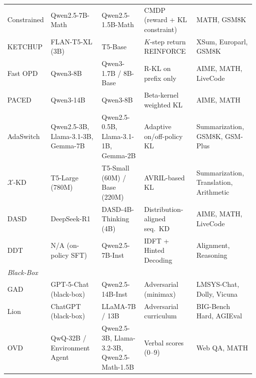 \documentclass{article} %
\begin{document}
\begin{table}[t]
{\begin{tabular}{@{}lllll@{}}
        Constrained \citep{2509.22921} & Qwen2.5-7B-Math & Qwen2.5-1.5B-Math & CMDP (reward + KL constraint) & MATH, GSM8K \\
        KETCHUP \citep{2504.19024} & FLAN-T5-XL (3B) & T5-Base & $K$-step return REINFORCE & XSum, Europarl, GSM8K \\
        Fast OPD \citep{2602.15260} & Qwen3-8B & Qwen3-1.7B / 8B-Base & R-KL on prefix only & AIME, MATH, LiveCode \\
        PACED \citep{2603.11178} & Qwen3-14B & Qwen3-8B & Beta-kernel weighted KL & AIME, MATH \\
        AdaSwitch \citep{2510.07842} & Qwen2.5-3B, Llama-3.1-3B, Gemma-7B & Qwen2.5-0.5B, Llama-3.1-1B, Gemma-2B & Adaptive on/off-policy KL & Summarization, GSM8K, GSM-Plus \\
        $\mathcal{X}$-KD \citep{2602.12674} & T5-Large (780M) & T5-Small (60M) / Base (220M) & AVRIL-based KL & Summarization, Translation, Arithmetic \\
        DASD \citep{2601.09088} & DeepSeek-R1 & DASD-4B-Thinking (4B) & Distribution-aligned seq.\ KD & AIME, MATH, LiveCode \\
        DDT \citep{2602.12222} & N/A (on-policy SFT) & Qwen2.5-7B-Inst & IDFT + Hinted Decoding & Alignment, Reasoning \\
        \midrule
        \multicolumn{5}{l}{\textit{Black-Box}} \\
        \midrule
        GAD \citep{2511.10643} & GPT-5-Chat (black-box) & Qwen2.5-14B-Inst & Adversarial (minimax) & LMSYS-Chat, Dolly, Vicuna \\
        Lion \citep{2305.12870} & ChatGPT (black-box) & LLaMA-7B / 13B & Adversarial curriculum & BIG-Bench Hard, AGIEval \\
        OVD \citep{2601.21968} & QwQ-32B / Environment Agent & Qwen2.5-3B, Llama-3.2-3B, Qwen2.5-Math-1.5B & Verbal scores (0--9) & Web QA, MATH \\


\end{tabular}}
\end{table}
\end{document}
